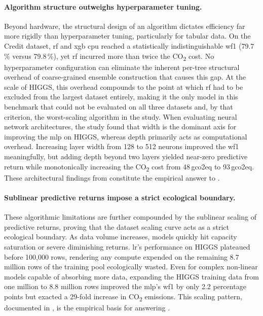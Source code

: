 \paragraph{Algorithm structure outweighs hyperparameter tuning.}
Beyond hardware, the structural design of an algorithm dictates efficiency far more rigidly than hyperparameter tuning, particularly for tabular data. On the Credit dataset, \gls{rf} and \gls{xgb} \gls{cpu} reached a statistically indistinguishable \gls{wf1} (79.7\,\% versus 79.8\,\%), yet \gls{rf} incurred more than twice the CO\textsubscript{2} cost. No hyperparameter configuration can eliminate the inherent per-tree structural overhead of coarse-grained ensemble construction that causes this gap. At the scale of HIGGS, this overhead compounds to the point at which \gls{rf} had to be excluded from the largest dataset entirely, making it the only model in this benchmark that could not be evaluated on all three datasets and, by that criterion, the worst-scaling algorithm in the study. When evaluating neural network architectures, the study found that width is the dominant axis for improving the \gls{mlp} on HIGGS, whereas depth primarily acts as computational overhead. Increasing layer width from 128 to 512 neurons improved the \gls{wf1} meaningfully, but adding depth beyond two layers yielded near-zero predictive return while monotonically increasing the CO\textsubscript{2} cost from 48\,\gls{gco2eq} to 93\,\gls{gco2eq}. These architectural findings from  constitute the empirical answer to .

\paragraph{Sublinear predictive returns impose a strict ecological boundary.}
These algorithmic limitations are further compounded by the sublinear scaling of predictive returns, proving that the dataset scaling curve acts as a strict ecological boundary. As data volume increases, models quickly hit capacity saturation or severe diminishing returns. \gls{lr}'s performance on HIGGS plateaued before 100{,}000 rows, rendering any compute expended on the remaining 8.7 million rows of the training pool ecologically wasted. Even for complex non-linear models capable of absorbing more data, expanding the HIGGS training data from one million to 8.8 million rows improved the \gls{mlp}'s \gls{wf1} by only 2.2 percentage points but exacted a 29-fold increase in CO\textsubscript{2} emissions. This scaling pattern, documented in , is the empirical basis for answering .

